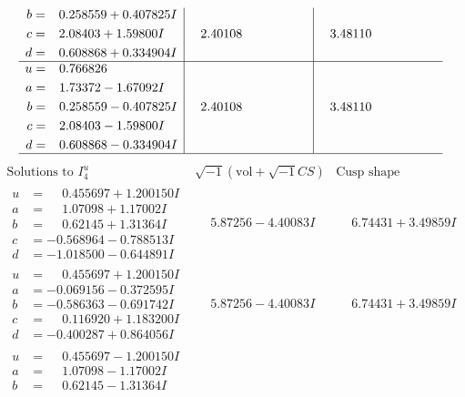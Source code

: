 \documentclass[1p]{elsarticle_modified}
\theoremstyle{definition}
\newcommand{\I}{\sqrt{-1}}
\begin{document}
$$\begin{array}{c|c|c}
\begin{aligned}
b &= \phantom{-}0.258559 + 0.407825 I \\
c &= \phantom{-}2.08403 + 1.59800 I \\
d &= \phantom{-}0.608868 + 0.334904 I\end{aligned}
 & \phantom{-}2.40108\phantom{ +0.000000I} & \phantom{-}3.48110\phantom{ +0.000000I} \\ \hline\begin{aligned}
u &= \phantom{-}0.766826\phantom{ +0.000000I} \\
a &= \phantom{-}1.73372 - 1.67092 I \\
b &= \phantom{-}0.258559 - 0.407825 I \\
c &= \phantom{-}2.08403 - 1.59800 I \\
d &= \phantom{-}0.608868 - 0.334904 I\end{aligned}
 & \phantom{-}2.40108\phantom{ +0.000000I} & \phantom{-}3.48110\phantom{ +0.000000I}\\
 \hline 
 \end{array}$$\newpage$$\begin{array}{c|c|c}  
\text{Solutions to }I^u_{4}& \I (\text{vol} + \sqrt{-1}CS) & \text{Cusp shape}\\
 \hline 
\begin{aligned}
u &= \phantom{-}0.455697 + 1.200150 I \\
a &= \phantom{-}1.07098 + 1.17002 I \\
b &= \phantom{-}0.62145 + 1.31364 I \\
c &= -0.568964 - 0.788513 I \\
d &= -1.018500 - 0.644891 I\end{aligned}
 & \phantom{-}5.87256 - 4.40083 I & \phantom{-}6.74431 + 3.49859 I \\ \hline\begin{aligned}
u &= \phantom{-}0.455697 + 1.200150 I \\
a &= -0.069156 - 0.372595 I \\
b &= -0.586363 - 0.691742 I \\
c &= \phantom{-}0.116920 + 1.183200 I \\
d &= -0.400287 + 0.864056 I\end{aligned}
 & \phantom{-}5.87256 - 4.40083 I & \phantom{-}6.74431 + 3.49859 I \\ \hline\begin{aligned}
u &= \phantom{-}0.455697 - 1.200150 I \\
a &= \phantom{-}1.07098 - 1.17002 I \\
b &= \phantom{-}0.62145 - 1.31364 I \\

\end{aligned}
\end{array}$$
\end{document}
